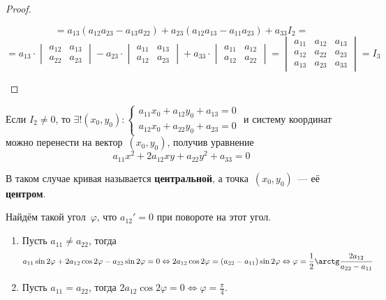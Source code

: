 \begin{proof}
\begin{itemize}
\begin{equation*}
	= a_{13} (a_{12} a_{23} - a_{13} a_{22}) + a_{23} (a_{12} a_{13} - a_{11} a_{23}) + a_{33} I_2 =
	\end{equation*}
	\begin{equation*}
	= a_{13} \cdot
	\begin{vmatrix}
	a_{12} & a_{13} \\
	a_{22} & a_{23}
	\end{vmatrix} -
	a_{23} \cdot
	\begin{vmatrix}
	a_{11} & a_{13} \\
	a_{12} & a_{23}
	\end{vmatrix} +
	a_{33} \cdot
	\begin{vmatrix}
	a_{11} & a_{12} \\
	a_{12} & a_{22}
	\end{vmatrix} =
	\begin{vmatrix}
	a_{11} & a_{12} & a_{13} \\
	a_{12} & a_{22} & a_{23} \\
	a_{13} & a_{23} & a_{33}
	\end{vmatrix} = I_3
	\end{equation*}
\end{itemize}
\end{proof}

Если $I_2 \neq 0$, то $\exists! (x_0, y_0) \colon
\begin{cases}
a_{11} x_0 + a_{12} y_0 + a_{13} = 0 \\
a_{12} x_0 + a_{22} y_0 + a_{23} = 0
\end{cases}$ и систему координат можно перенести на вектор~$(x_0, y_0)$, получив уравнение
\begin{equation*}
a_{11} x^2 + 2 a_{12} xy + a_{22} y^2 + a_{33} = 0
\end{equation*}

В таком случае кривая называется \textbf{центральной}, а точка~$(x_0, y_0)$~--- её \textbf{центром}.

Найдём такой угол~$\varphi$, что $a_{12}' = 0$ при повороте на этот угол.
\begin{enumerate}
	\item Пусть $a_{11} \neq a_{22}$, тогда
	\begin{equation*}
	a_{11} \sin 2\varphi + 2 a_{12} \cos 2\varphi - a_{22} \sin 2\varphi = 0 \Leftrightarrow
	2 a_{12} \cos 2\varphi = (a_{22} - a_{11}) \sin 2\varphi \Leftrightarrow
	\varphi = \frac12 \arctg \frac{2 a_{12}}{a_{22} - a_{11}}
	\end{equation*}
	
	\item Пусть $a_{11} = a_{22}$, тогда $2 a_{12} \cos 2\varphi = 0 \Leftrightarrow
	\varphi = \frac\pi4$.
\end{enumerate}
                                                              
